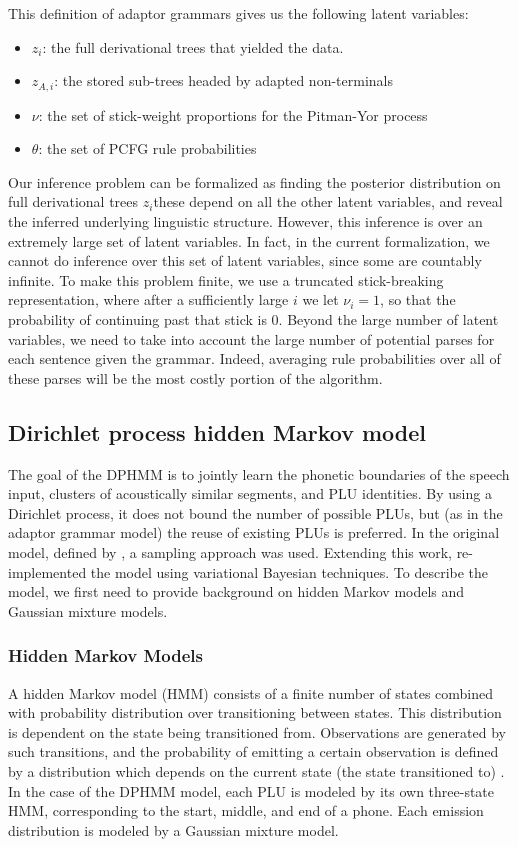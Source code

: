 \documentclass[12pt,letterpaper]{article}
\begin{document}
This definition of adaptor grammars gives us the following latent variables: 
\begin{itemize}
\item $z_i$: the full derivational trees that yielded the data. 
\item $z_{A,i}$: the stored sub-trees headed by adapted non-terminals
\item $\nu$: the set of stick-weight proportions for the Pitman-Yor process
\item $\theta$: the set of PCFG rule probabilities 
\end{itemize}
Our inference problem can be formalized as finding the posterior distribution on full derivational trees $z_i$\textemdash these depend on all the other latent variables, and reveal the inferred underlying linguistic structure. However, this inference is over an extremely large set of latent variables. In fact, in the current formalization, we cannot do inference over this set of latent variables, since some are countably infinite. To make this problem finite, we use a truncated stick-breaking representation, where after a sufficiently large $i$ we let $\nu_i = 1$, so that the probability of continuing past that stick is 0. Beyond the large number of latent variables, we need to take into account the large number of potential parses for each sentence given the grammar. Indeed, averaging rule probabilities over all of these parses will be the most costly portion of the algorithm. 

\subsection{Dirichlet process hidden Markov model}
The goal of the DPHMM is to jointly learn the phonetic boundaries of the speech input, clusters of acoustically similar segments, and PLU identities. By using a Dirichlet process, it does not bound the number of possible PLUs, but (as in the adaptor grammar model) the reuse of existing PLUs is preferred. In the original model, defined by \citet{lee:2012}, a sampling approach was used. Extending this work, \citet{ondel:2016} re-implemented the model using variational Bayesian techniques. To describe the model, we first need to provide background on hidden Markov models and Gaussian mixture models.
\subsubsection{Hidden Markov Models}
A hidden Markov model (HMM) consists of a finite number of states combined with probability distribution over transitioning between states. This distribution is dependent on the state being transitioned from. Observations are generated by such transitions, and the probability of emitting a certain observation is defined by a distribution which depends on the current state (the state transitioned to) \citep{rabiner:1986}. In the case of the DPHMM model, each PLU is modeled by its own three-state HMM, corresponding to the start, middle, and end of a phone. Each emission distribution is modeled by a Gaussian mixture model. 
\end{document}
